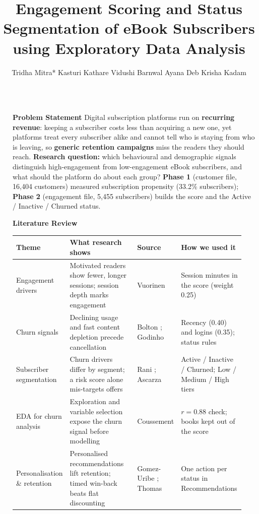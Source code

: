 \documentclass[final]{beamer}
\title{Engagement Scoring and Status \\ Segmentation of eBook Subscribers \\ using Exploratory Data Analysis}
\author{Tridha Mitra* \quad Kasturi Kathare \quad Vidushi Barnwal \quad Ayana Deb \quad Krisha Kadam}
\institute[shortinst]{
\itshape
Presented at HITA 2026, International Conference on Hybrid Intelligence: Theories and Applications,\\
School of Technology Management \& Engineering,
Navi-Mumbai, India, October 30--31, 2026.
}
\newlength{\sepwidth}
\newlength{\colwidth}
\newcommand{\separatorcolumn}{\begin{column}{\sepwidth}\end{column}}
\begin{document}
\begin{frame}[t]
\begin{columns}[t]
\separatorcolumn

\begin{column}{\colwidth}

\begin{block}{\textbf{Problem Statement}}
Digital subscription platforms run on \textbf{recurring revenue}: keeping a subscriber costs less than acquiring a new one, yet platforms treat every subscriber alike and cannot tell who is staying from who is leaving, so \textbf{generic retention campaigns} miss the readers they should reach. \textbf{Research question:} which behavioural and demographic signals distinguish high-engagement from low-engagement eBook subscribers, and what should the platform do about each group? \textbf{Phase 1} (customer file, 16,404 customers) measured subscription propensity (33.2\% subscribers); \textbf{Phase 2} (engagement file, 5,455 subscribers) builds the score and the Active / Inactive / Churned status.
\end{block}
\vspace{0.5cm}

\begin{block}{\textbf{Literature Review}}
\fontsize{20}{25}\selectfont
\centering
\setlength{\tabcolsep}{4pt}
\begin{tabular}{p{0.17\linewidth} p{0.30\linewidth} p{0.19\linewidth} p{0.28\linewidth}}
\toprule
\textbf{Theme} & \textbf{What research shows} & \textbf{Source} & \textbf{How we used it} \\
\midrule
Engagement drivers & Motivated readers show fewer, longer sessions; session depth marks engagement & Vuorinen \cite{vuorinen2024} & Session minutes in the score (weight 0.25) \\
Churn signals & Declining usage and fast content depletion precede cancellation & Bolton \cite{bolton1999}; Godinho \cite{godinho2020} & Recency (0.40) and logins (0.35); status rules \\
Subscriber segmentation & Churn drivers differ by segment; a risk score alone mis-targets offers & Rani \cite{rani2023}; Ascarza \cite{ascarza2018} & Active / Inactive / Churned; Low / Medium / High tiers \\
EDA for churn analysis & Exploration and variable selection expose the churn signal before modelling & Coussement \cite{coussement2008} & $r = 0.88$ check; books kept out of the score \\
Personalisation \& retention & Personalised recommendations lift retention; timed win-back beats flat discounting & Gomez-Uribe \cite{gomezuribe2016}; Thomas \cite{thomas2004} & One action per status in Recommendations \\
\bottomrule
\end{tabular}
\end{block}
\vspace{0.5cm}


\end{column}
\end{columns}
\end{frame}
\end{document}
